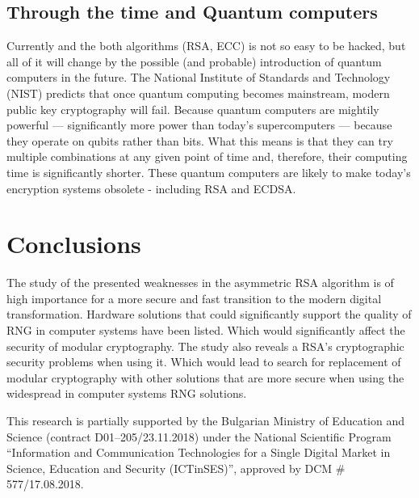 \documentclass[graybox]{svmult}
\begin{document}
\subsection{Through the time and Quantum computers}
\label{sub-sec:6-3}

Currently and the both algorithms (RSA, ECC) is not so easy to be hacked, but all of it will change by the possible (and probable) introduction of quantum computers in the future. The National Institute of Standards and Technology (NIST) predicts that once quantum computing becomes mainstream, modern public key cryptography will fail. Because quantum computers are mightily powerful — significantly more power than today’s supercomputers — because they operate on qubits rather than bits. What this means is that they can try multiple combinations at any given point of time and, therefore, their computing time is significantly shorter. These quantum computers are likely to make today’s encryption systems obsolete - including RSA and ECDSA.

\section{Conclusions}
\label{sec:7}

The study of the presented weaknesses in the asymmetric RSA algorithm is of high importance for a more secure and fast transition to the modern digital transformation. Hardware solutions that could significantly support the quality of RNG in computer systems have been listed. Which would significantly affect the security of modular cryptography. The study also reveals a RSA's cryptographic security problems when using it. Which would lead to search for replacement of modular cryptography with other solutions that are more secure when using the widespread in computer systems RNG solutions.

\begin{acknowledgement}
This research is partially supported by the Bulgarian Ministry of Education and Science (contract D01–205/23.11.2018) under the National Scientific Program ``Information and Communication Technologies for a Single Digital Market in Science, Education and Security (ICTinSES)'', approved by DCM \# 577/17.08.2018.
\end{acknowledgement}


\end{document}
